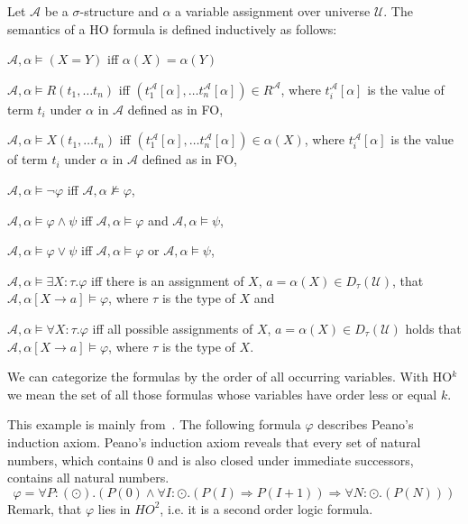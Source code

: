 \begin{definition}
    Let $\mathcal{A}$ be a $\sigma$-structure and $\alpha$ a variable assignment over universe $\mathcal{U}$. The
    semantics of a HO formula is defined inductively as follows:
    \begin{compactitem}
        \item $\mathcal{A}, \alpha \models (X = Y)$ iff $\alpha(X) = \alpha(Y)$
        \item $\mathcal{A}, \alpha \models R(t_1, \dots t_n)$ iff $(t_1^{\mathcal{A}}[\alpha], \dots
        t_n^{\mathcal{A}}[\alpha]) \in R^{\mathcal{A}}$, where $t_i^{\mathcal{A}}[\alpha]$ is the value of term
        $t_i$ under $\alpha$ in $\mathcal{A}$ defined as in FO,
        \item $\mathcal{A}, \alpha \models X(t_1, \dots t_n)$ iff $(t_1^{\mathcal{A}}[\alpha], \dots
        t_n^{\mathcal{A}}[\alpha]) \in \alpha(X)$, where $t_i^{\mathcal{A}}[\alpha]$ is the value of term
        $t_i$ under $\alpha$ in $\mathcal{A}$ defined as in FO,
        \item $\mathcal{A}, \alpha \models \neg\varphi$ iff $\mathcal{A}, \alpha\not\models\varphi$,
        \item $\mathcal{A}, \alpha \models \varphi \wedge \psi$ iff $\mathcal{A}, \alpha\models\varphi$ and $\mathcal{A},
        \alpha\models\psi$,
        \item $\mathcal{A}, \alpha \models \varphi \vee \psi$ iff $\mathcal{A}, \alpha\models\varphi$ or $\mathcal{A},
        \alpha\models\psi$,
        \item $\mathcal{A}, \alpha \models \exists X:\tau.\varphi$ iff there is an assignment of $X$, $a =
        \alpha
        (X) \in D_{\tau}
        (\mathcal{U})$, that $\mathcal{A}, \alpha[X \rightarrow a] \models \varphi$, where $\tau$ is the type of $X$ and
        \item $\mathcal{A}, \alpha \models \forall X:\tau.\varphi$ iff all possible assignments of $X$, $a =
        \alpha(X) \in
        D_{\tau}(\mathcal{U})$ holds that $\mathcal{A}, \alpha[X \rightarrow a] \models \varphi$, where $\tau$ is the
        type of
        $X$.
        \end{compactitem}
\end{definition}

We can categorize the formulas by the order of all occurring variables. With HO$^k$ we mean the set of all those
formulas whose variables have order less or equal $k$.

\begin{example}
    \label{example:ho}
    This example is mainly from~\cite{vanBenthem2001higher}. The following formula $\varphi$ describes Peano's
    induction axiom. Peano's induction axiom reveals that every set of natural numbers, which contains $0$ and is
    also closed under immediate successors, contains all natural numbers.
    \[\varphi = \forall P:(\odot).(P(0) \wedge \forall I:\odot.(P(I) \Rightarrow P(I + 1)) \Rightarrow \forall N
   :\odot.(P(N)))\]
    Remark, that $\varphi$ lies in $\mathit{HO}^2$, i.e. it is a second order logic formula.
\end{example}

